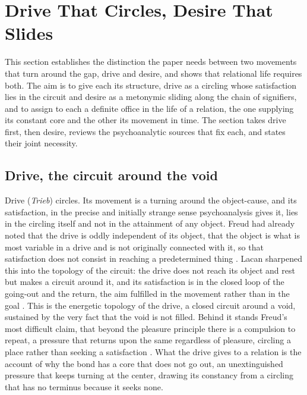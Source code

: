 \section{Drive That Circles, Desire That Slides}
\label{p26:sec:drivedesire}

\noindent
This section establishes the distinction the paper needs between two movements that turn around the gap, drive and desire, and shows that relational life requires both. The aim is to give each its structure, drive as a circling whose satisfaction lies in the circuit and desire as a metonymic sliding along the chain of signifiers, and to assign to each a definite office in the life of a relation, the one supplying its constant core and the other its movement in time. The section takes drive first, then desire, reviews the psychoanalytic sources that fix each, and states their joint necessity.

\subsection*{Drive, the circuit around the void}

Drive (\emph{Trieb}) circles. Its movement is a turning around the object-cause, and its satisfaction, in the precise and initially strange sense psychoanalysis gives it, lies in the circling itself and not in the attainment of any object. Freud had already noted that the drive is oddly independent of its object, that the object is what is most variable in a drive and is not originally connected with it, so that satisfaction does not consist in reaching a predetermined thing \parencite{freud1915instincts}. Lacan sharpened this into the topology of the circuit: the drive does not reach its object and rest but makes a circuit around it, and its satisfaction is in the closed loop of the going-out and the return, the aim fulfilled in the movement rather than in the goal \parencite{lacan1977xi}. This is the energetic topology of the drive, a closed circuit around a void, sustained by the very fact that the void is not filled. Behind it stands Freud's most difficult claim, that beyond the pleasure principle there is a compulsion to repeat, a pressure that returns upon the same regardless of pleasure, circling a place rather than seeking a satisfaction \parencite{freud1920beyond}. What the drive gives to a relation is the account of why the bond has a core that does not go out, an unextinguished pressure that keeps turning at the center, drawing its constancy from a circling that has no terminus because it seeks none.

